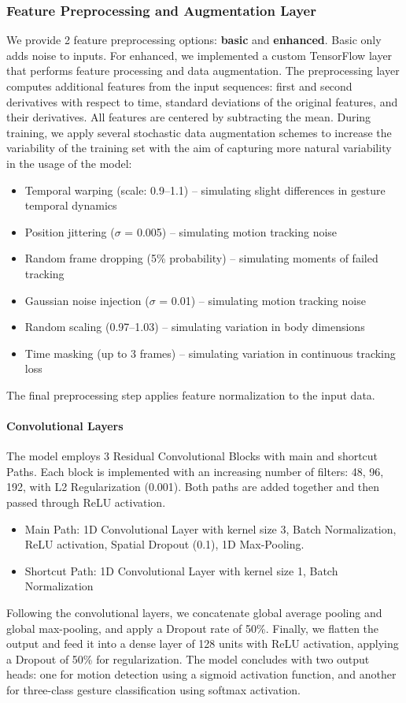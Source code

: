 \documentclass[11pt,smallheadings,cleardoublepage=empty,tocflat,numbers=noenddot,twoside,captions=tableheading]{scrbook}
\begin{document}
\begin{refsection}
\subsubsection{Feature Preprocessing and Augmentation Layer}
We provide 2 feature preprocessing options: \textbf{basic} and \textbf{enhanced}. Basic only adds noise to inputs. For enhanced, we implemented a custom TensorFlow layer that performs feature processing and data augmentation. The preprocessing layer computes additional features from the input sequences: first and second derivatives with respect to time, standard deviations of the original features, and their derivatives. All features are centered by subtracting the mean.
During training, we apply several stochastic data augmentation schemes to increase the variability of the training set with the aim of capturing more natural variability in the usage of the model:
\begin{itemize}
\item Temporal warping (scale: 0.9--1.1) -- simulating slight differences in gesture temporal dynamics
\item Position jittering ($\sigma$ = 0.005) -- simulating motion tracking noise
\item Random frame dropping (5\% probability) -- simulating moments of failed tracking
\item Gaussian noise injection ($\sigma$ = 0.01) -- simulating motion tracking noise
\item Random scaling (0.97--1.03) -- simulating variation in body dimensions
\item Time masking (up to 3 frames) -- simulating variation in continuous tracking loss
\end{itemize}
The final preprocessing step applies feature normalization to the input data.

\paragraph{Convolutional Layers}
The model employs 3 Residual Convolutional Blocks with main and shortcut Paths. Each block is implemented with an increasing number of filters: 48, 96, 192, with L2 Regularization (0.001). Both paths are added together and then passed through ReLU activation.
\begin{itemize}
\item Main Path: 1D Convolutional Layer with kernel size 3, Batch Normalization, ReLU activation, Spatial Dropout (0.1), 1D Max-Pooling.
\item Shortcut Path: 1D Convolutional Layer with kernel size 1, Batch Normalization
\end{itemize}
Following the convolutional layers, we concatenate global average pooling and global max-pooling, and apply a Dropout rate of 50\%. Finally, we flatten the output and feed it into a dense layer of 128 units with ReLU activation, applying a Dropout of 50\% for regularization. The model concludes with two output heads: one for motion detection using a sigmoid activation function, and another for three-class gesture classification using softmax activation.



\end{refsection}
\end{document}
